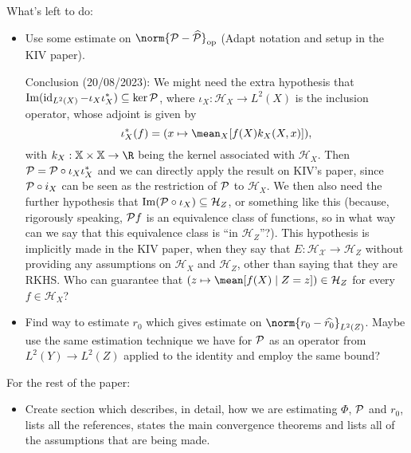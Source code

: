 {\color{red}
    What's left to do:
    \begin{itemize}

        \item Use some estimate on $ \norm{ \meanop - \hat{ \meanop } }_{ \mathrm{op} } $ (Adapt notation and setup in the KIV paper).

            {\color{blue}
                Conclusion (20/08/2023): We might need the extra hypothesis that $ \operatorname{Im} ( \operatorname{id}_{ L^2 ( X ) } - \iota_{ X } \iota_{ X }^{ * } ) \subseteq \ker \mathcal{P} $, where $ \iota_{ X } : \mathcal{H}_{ X } \to L^{ 2 } ( X ) $ is the inclusion operator, whose adjoint is given by
                \begin{equation*}
                    \iota_{ X }^{ * } ( f ) = ( x \mapsto \mean_{ X } [ f ( X ) k_{ X } ( X, x ) ] )
                ,\end{equation*}
                with $ k_{ X } : \mathbb{X} \times \mathbb{X} \to \R $ being the kernel associated with $ \mathcal{H}_{ X } $.
                Then $ \mathcal{P} = \mathcal{P} \circ \iota_{ X } \iota_{ X }^{ * } $ and we can directly apply the result on KIV's paper, since $ \mathcal{P} \circ i_{ X } $ can be seen as the restriction of $ \mathcal{P} $ to $ \mathcal{H}_{ X } $.
                We then also need the further hypothesis that $ \operatorname{Im} ( \mathcal{P} \circ \iota_{ X } ) \subseteq \mathcal{H}_{ Z } $, or something like this (because, rigorously speaking, $ \mathcal{P} f $ is an equivalence class of functions, so in what way can we say that this equivalence class is ``in $ \mathcal{H}_{ Z } $''?).
                This hypothesis is implicitly made in the KIV paper, when they say that $ E : \mathcal{H_{ X }} \to \mathcal{H}_{ Z } $ without providing any assumptions on $ \mathcal{H}_{ X } $ and $ \mathcal{H}_{ Z } $, other than saying that they are RKHS.
                Who can guarantee that $ (z \mapsto \mean [ f ( X ) \mid Z = z ]) \in \mathcal{H}_{ Z } $ for every $ f \in \mathcal{H}_{ X } $?
            }

        \item Find way to estimate $ r_{ 0 } $ which gives estimate on $ \norm{ r_{ 0 } - \hat{ r_{ 0 } } }_{ L^{ 2 } ( Z ) } $.
            Maybe use the same estimation technique we have for $ \mathcal{P} $ as an operator from $ L^2 ( Y ) \to L^2 ( Z ) $ applied to the identity and employ the same bound?
    \end{itemize}
    For the rest of the paper:
    \begin{itemize}
        \item Create section which describes, in detail, how we are estimating $ \Phi $, $ \mathcal{P} $ and $ r_{ 0 } $, lists all the references, states the main convergence theorems and lists all of the assumptions that are being made.


\end{itemize}}
